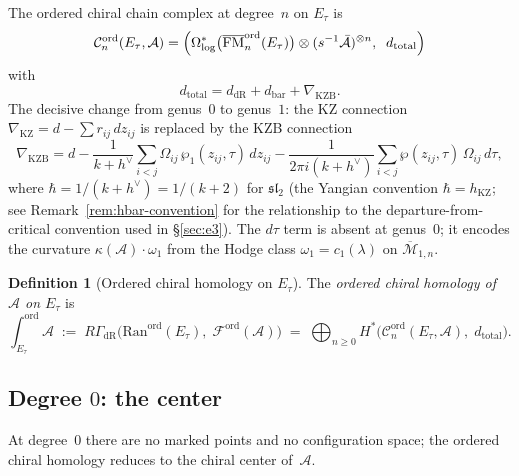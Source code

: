 \documentclass[11pt,reqno]{amsart}
\theoremstyle{definition}
\newtheorem{definition}[theorem]{Definition}
\theoremstyle{remark}
\newcommand{\cA}{\mathcal{A}}
\newcommand{\cC}{\mathcal{C}}
\newcommand{\cF}{\mathcal{F}}
\newcommand{\cM}{\mathcal{M}}
\newcommand{\Ran}{\mathrm{Ran}}
\DeclareMathOperator{\FM}{FM}
\numberwithin{equation}{section}
\begin{document}
The ordered chiral chain complex at degree~$n$ on $E_\tau$
is
\begin{equation}\label{eq:ell-chiral-cx}
  \cC_n^{\mathrm{ord}}(E_\tau, \cA)
  = \Bigl(
  \Omega^*_{\log}\bigl(
  \overline{\FM}_n^{\mathrm{ord}}(E_\tau)\bigr)
  \otimes (s^{-1}\bar{\cA})^{\otimes n},
  \;\; d_{\mathrm{total}}
  \Bigr)
\end{equation}
with
\begin{equation}\label{eq:d-total-ell}
  d_{\mathrm{total}}
  = d_{\mathrm{dR}}
  + d_{\mathrm{bar}}
  + \nabla_{\mathrm{KZB}}.
\end{equation}
The decisive change from genus~$0$ to genus~$1$: the
KZ connection $\nabla_{\mathrm{KZ}} = d - \sum r_{ij}\,dz_{ij}$
is replaced by the KZB connection
\begin{equation}\label{eq:kzb-ell}
  \nabla_{\mathrm{KZB}}
  = d
  - \frac{1}{k + h^\vee}
  \sum_{i < j} \Omega_{ij}\,
  \wp_1(z_{ij}, \tau)\,dz_{ij}
  - \frac{1}{2\pi i(k + h^\vee)}
  \sum_{i < j} \wp(z_{ij}, \tau)\,\Omega_{ij}\,d\tau,
\end{equation}
where $\hbar = 1/(k + h^\vee) = 1/(k+2)$ for
$\mathfrak{sl}_2$
\textup{(}the Yangian convention
$\hbar = h_{\mathrm{KZ}}$; see
Remark~\textup{\ref{rem:hbar-convention}} for the
relationship to the departure-from-critical convention
used in \S\textup{\ref{sec:e3}}\textup{)}.
The $d\tau$ term is absent at genus~$0$; it encodes the
curvature $\kappa(\cA) \cdot \omega_1$ from the Hodge class
$\omega_1 = c_1(\lambda)$ on $\overline{\cM}_{1,n}$.

\begin{definition}[Ordered chiral homology on $E_\tau$]
\label{def:ord-ch-ell}
The \emph{ordered chiral homology of $\cA$ on $E_\tau$} is
\begin{equation}\label{eq:ord-ch-ell}
  \int_{E_\tau}^{\mathrm{ord}} \cA
  \;:=\;
  R\Gamma_{\mathrm{dR}}\bigl(
  \Ran^{\mathrm{ord}}(E_\tau),\;
  \cF^{\mathrm{ord}}(\cA)\bigr)
  \;=\;
  \bigoplus_{n \geq 0}
  H^*\bigl(
  \cC_n^{\mathrm{ord}}(E_\tau, \cA),\;
  d_{\mathrm{total}}\bigr).
\end{equation}
\end{definition}

\subsection{Degree $0$: the center}
\label{subsec:ell-degree0}

At degree~$0$ there are no marked points and no
configuration space; the ordered chiral homology reduces
to the chiral center of~$\cA$.
\end{document}
